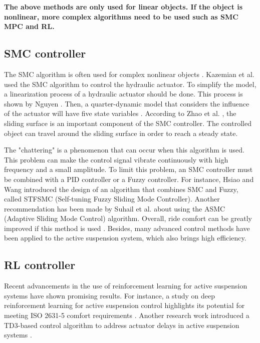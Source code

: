 \textbf{The above methods are only used for linear objects. If the object is nonlinear, more complex algorithms need to be used such as SMC MPC and RL.}




\subsection{SMC controller}
	The SMC algorithm is often used for complex nonlinear objects \cite{meetei2021enhanced}. Kazemian et al. used the SMC algorithm to control the hydraulic actuator. To simplify the model, a linearization process of a hydraulic actuator should be done. This process is shown by Nguyen \cite{nguyen2021advance}. Then, a quarter-dynamic model that considers the influence of the actuator will have five state variables \cite{nguyen2022novel}. According to Zhao et al. \cite{zhao2023sliding}, the sliding surface is an important component of the SMC controller. The controlled object can travel around the sliding surface in order to reach a steady state.
	
	The "chattering" is a phenomenon that can occur when this algorithm is used. This problem can make the control signal vibrate continuously with high frequency and a small amplitude. To limit this problem, an SMC controller must be combined with a PID controller or a Fuzzy controller. For instance, Hsiao and Wang \cite{hsiao2022evaluation} introduced the design of an algorithm that combines SMC and Fuzzy, called STFSMC (Self-tuning Fuzzy Sliding Mode Controller). Another recommendation has been made by Suhail et al. \cite{suhail2022adaptive} about using the ASMC (Adaptive Sliding Mode Control) algorithm. Overall, ride comfort can be greatly improved if this method is used \cite{wang2018nonlinear}. Besides, many advanced control methods have been applied to the active suspension system, which also brings high efficiency.

	
\subsection{RL controller}
	Recent advancements in the use of reinforcement learning for active suspension systems have shown promising results. For instance, a study on deep reinforcement learning for active suspension control highlights its potential for meeting ISO 2631-5 comfort requirements \cite{deep_rl_suspension}. Another research work introduced a TD3-based control algorithm to address actuator delays in active suspension systems \cite{td3_active_suspension}. 
	
